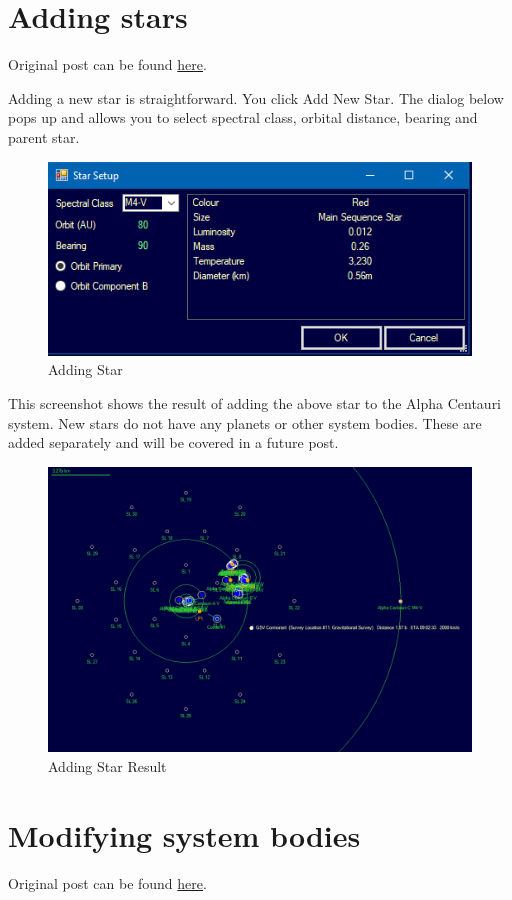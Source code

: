 \documentclass[../Aurora C# unofficial manual.tex]{subfiles}
\begin{document}
	
	\section{Adding stars}\label{2_adding_stars}
	Original post can be found
	\href{http://aurora2.pentarch.org/index.php?topic=8495.msg118727#msg118727}{here}.
	\newline\newline
	
	Adding a new star is straightforward. You click Add New Star. The dialog below pops up and allows you to select spectral class, orbital distance, bearing and parent star.
	\begin{figure}[H]
		\centering
		\includegraphics[width=0.5\linewidth]{images/AddingStar}
		\caption[Adding Star]{Adding Star}
		\label{fig:addingstar}
	\end{figure}
	
	This screenshot shows the result of adding the above star to the Alpha Centauri system. New stars do not have any planets or other system bodies. These are added separately and will be covered in a future post.
	\begin{figure}[H]
		\centering
		\includegraphics[width=0.95\linewidth]{images/AddingStar2}
		\caption[Adding Star Result]{Adding Star Result}
		\label{fig:addingstar2}
	\end{figure}
	

	\section{Modifying system bodies}\label{3_modifying system_bodies}
	Original post can be found
	\href{http://aurora2.pentarch.org/index.php?topic=8495.msg118744#msg118744}{here}.
	\newline\newline
	
\end{document}
